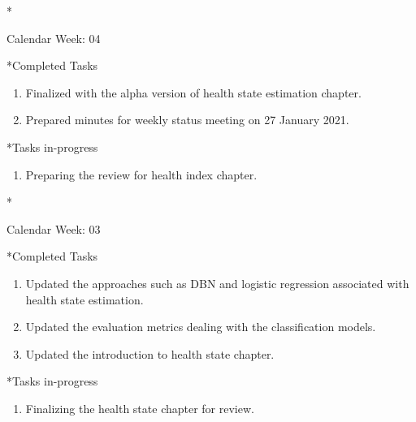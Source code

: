 \documentclass[11pt,a4paper]{article}
\begin{document}
\newpage
\begin{section}*{Calendar Week: 04 \hfill \date{29 January, 2021}}

\begin{subsection}*{Completed Tasks}
    \begin{enumerate}
        \item 
            Finalized with the alpha version of health state estimation chapter.
        \item 
            Prepared minutes for weekly status meeting on 27 January 2021.
    \end{enumerate}
\end{subsection}

\begin{subsection}*{Tasks in-progress}
    \begin{enumerate}
        \item
           Preparing the review for health index chapter.
        
        \end{enumerate}
\end{subsection}

\end{section}
\newpage
\begin{section}*{Calendar Week: 03 \hfill \date{21 January, 2021}}

\begin{subsection}*{Completed Tasks}
    \begin{enumerate}
        \item 
            Updated the approaches such as DBN and logistic regression associated with health state estimation.
        \item
            Updated the evaluation metrics dealing with the classification models.
        \item
            Updated the introduction to health state chapter.
        
    \end{enumerate}
\end{subsection}

\begin{subsection}*{Tasks in-progress}
    \begin{enumerate}
        \item
           Finalizing the health state chapter for review.
        
        \end{enumerate}
\end{subsection}

\end{section}
\end{document}
